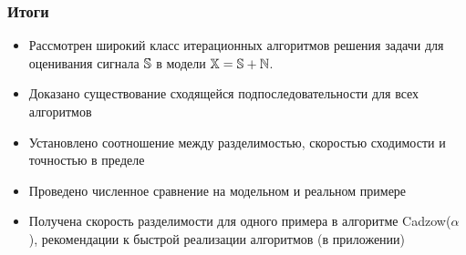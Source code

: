 \documentclass[unicode, notheorems]{beamer}
\begin{document}

\begin{frame}
	\frametitle{Итоги}
	\begin{itemize}
		\item Рассмотрен широкий класс итерационных алгоритмов решения задачи 
		для оценивания сигнала $\mathbb{S}$  в модели $\mathbb{X} = \mathbb{S} + \mathbb{N}$.
		\item Доказано существование сходящейся подпоследовательности для всех алгоритмов
		\item Установлено соотношение между разделимостью, скоростью сходимости и точностью в пределе
		\item Проведено численное сравнение на модельном и реальном примере
		\item Получена скорость разделимости для одного примера в алгоритме Cadzow($\alpha$), рекомендации к быстрой реализации алгоритмов (в приложении)
	\end{itemize}
	
\end{frame}


\end{document}

